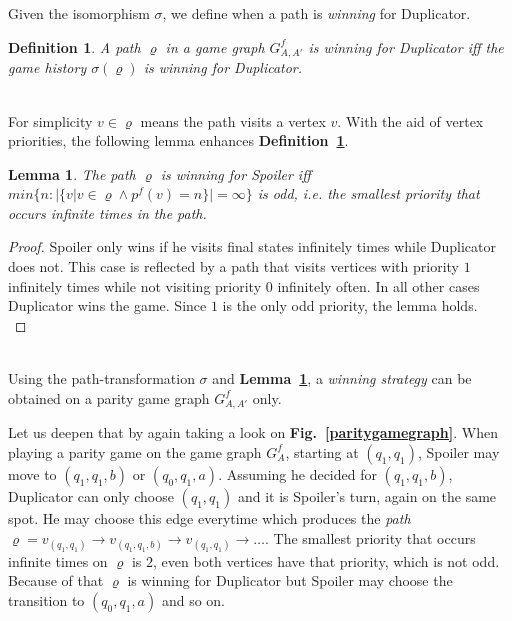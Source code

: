 \documentclass[12pt,oneside,bibliography=totoc,abstracton]{scrartcl}
\newcommand{\figref}[1]{\textbf{Fig.~\ref{#1}}}
\newcommand{\lemmaref}[1]{\textbf{Lemma~\ref{#1}}}
\newcommand{\defref}[1]{\textbf{Definition~\ref{#1}}}
\newtheorem{mydef}{Definition}
\newtheorem{mylemma}{Lemma}
\begin{document}
Given the isomorphism $\sigma$, we define when a path is \textit{winning} for Duplicator.
\begin{mydef}\label{def_pathwinning}
	A path $\varrho$ in a game graph $G^f_{A, A'}$ is \textnormal{winning} for Duplicator
	iff the game history $\sigma(\varrho)$ is \textnormal{winning} for Duplicator.
\end{mydef}\quad\\
For simplicity $v \in \varrho$ means the path visits a vertex $v$.
With the aid of vertex priorities, the following lemma enhances \defref{def_pathwinning}.
\begin{mylemma}\label{lemma_pathwinningext}
	The \textnormal{path} $\varrho$ is \textnormal{winning} for Spoiler iff
	$min\{n : |\{v | v \in \varrho \land p^f(v) = n\}| = \infty\}$ is \textnormal{odd},
	i.e. the smallest priority that occurs infinite times in the path.
\end{mylemma}
\begin{proof}
	Spoiler only wins if he visits final states infinitely times while Duplicator does not. This case is reflected by
	a path that visits vertices with priority $1$ infinitely times while not visiting priority $0$ infinitely often.
	In all other cases Duplicator wins the game. Since $1$ is the only odd priority, the lemma holds.\\
\end{proof}\quad\\
Using the path-transformation $\sigma$ and \lemmaref{lemma_pathwinningext}, a \textit{winning strategy}
can be obtained on a parity game graph $G^f_{A, A'}$ only.

Let us deepen that by again taking a look on \figref{paritygamegraph}.
When playing a parity game on the game graph $G^f_A$, starting at $(q_1, q_1)$,
Spoiler may move to $(q_1, q_1, b)$ or $(q_0, q_1, a)$. Assuming he decided for $(q_1, q_1, b)$, Duplicator can
only choose $(q_1, q_1)$ and it is Spoiler's turn, again on the same spot. He may choose this edge everytime
which produces the \textit{path} $\varrho = v_{(q_1, q_1)} \rightarrow v_{(q_1, q_1, b)} \rightarrow v_{(q_1, q_1)} \rightarrow \ldots$.
The smallest priority that occurs infinite times on $\varrho$ is $2$, even both vertices have that priority, which is not odd.
Because of that $\varrho$ is winning for Duplicator but Spoiler may choose the transition to $(q_0, q_1, a)$ and so on.
\end{document}
